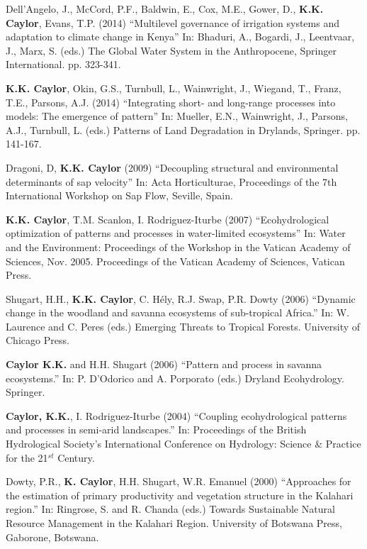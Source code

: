 \documentclass[10pt]{report}
\begin{document}
\begin{etaremune}

\item Dell'Angelo, J., McCord, P.F., Baldwin, E., Cox, M.E., Gower, D., \textbf{K.K. Caylor}, Evans, T.P. (2014) ``Multilevel governance of irrigation systems and adaptation to climate change in Kenya'' In: Bhaduri, A., Bogardi, J., Leentvaar, J., Marx, S. (eds.) The Global Water System in the Anthropocene, Springer International. pp. 323-341.

\item \textbf{K.K. Caylor}, Okin, G.S., Turnbull, L., Wainwright, J., Wiegand, T., Franz, T.E., Parsons, A.J. (2014) ``Integrating short- and long-range processes into models: The emergence of pattern'' In: Mueller, E.N., Wainwright, J., Parsons, A.J., Turnbull, L. (eds.) Patterns of Land Degradation in Drylands, Springer. pp. 141-167.

\item Dragoni, D, \textbf{K.K. Caylor} (2009) ``Decoupling structural and environmental determinants of sap velocity'' In: Acta Horticulturae, Proceedings of the 7th International Workshop on Sap Flow, Seville, Spain.

\item \textbf{K.K. Caylor}, T.M. Scanlon, I. Rodriguez-Iturbe (2007) ``Ecohydrological optimization of patterns and processes in water-limited ecosystems'' In: Water and the Environment: Proceedings of the Workshop in the Vatican Academy of Sciences, Nov. 2005. Proceedings of the Vatican Academy of Sciences, Vatican Press.

\item Shugart, H.H., \textbf{K.K. Caylor}, C. H\'ely, R.J. Swap, P.R. Dowty (2006) ``Dynamic change in the woodland and savanna ecosystems of sub-tropical Africa.'' In: W. Laurence and C. Peres (eds.) Emerging Threats to Tropical Forests. University of Chicago Press.

\item \textbf{Caylor K.K.} and H.H. Shugart (2006) ``Pattern and process in savanna ecosystems.'' In: P. D'Odorico and A. Porporato (eds.) Dryland Ecohydrology. Springer.

\item \textbf{Caylor, K.K.}, I. Rodriguez-Iturbe (2004) ``Coupling ecohydrological patterns and processes in semi-arid landscapes.'' In: Proceedings of the British Hydrological Society's International Conference on Hydrology: Science \& Practice for the 21$^{st}$ Century. 

\item Dowty, P.R., \textbf{K. Caylor}, H.H. Shugart, W.R. Emanuel (2000) ``Approaches for the estimation of primary productivity and vegetation structure in the Kalahari region.'' In: Ringrose, S. and R. Chanda (eds.) Towards Sustainable Natural Resource Management in the Kalahari Region. University of Botswana Press, Gaborone, Botswana.

\end{etaremune}
\end{document}
